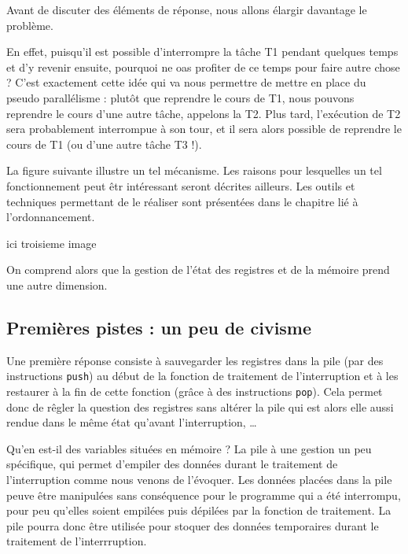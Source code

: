    Avant de discuter des éléments de réponse, nous allons élargir
davantage le problème.

   En effet, puisqu'il est possible d'interrompre la tâche T1
pendant quelques temps et d'y revenir ensuite, pourquoi ne
oas profiter de ce temps pour faire autre chose ? C'est exactement
cette idée qui va nous permettre de mettre en place du pseudo
parallélisme : plutôt que reprendre le cours de T1, nous pouvons
reprendre le cours d'une autre tâche, appelons la T2. Plus tard,
l'exécution de T2 sera probablement interrompue à son tour, et il sera
alors possible de reprendre le cours de T1 (ou d'une autre tâche T3
!). 

   La figure suivante illustre un tel mécanisme. Les raisons pour
lesquelles un tel fonctionnement peut êtr intéressant seront décrites
ailleurs. Les outils et techniques permettant de le réaliser sont
présentées dans le chapitre lié à l'ordonnancement.

ici troisieme image

   On comprend alors que la gestion de l'état des registres et de la
mémoire prend une autre dimension.
   
%
\subsection{Premières pistes : un peu de civisme}

   Une première réponse consiste à sauvegarder les registres dans la
pile (par des instructions \lstinline!push!) au début de la fonction
de traitement de l'interruption et à les restaurer à la fin de cette
fonction (grâce à des instructions \lstinline!pop!). Cela permet donc
de rêgler la question des registres sans altérer la pile qui est alors
elle aussi rendue dans le même état qu'avant l'interruption, \ldots

   Qu'en est-il des variables situées en mémoire ? La pile à une
gestion un peu spécifique, qui permet d'empiler des données durant le
traitement de l'interruption comme nous venons de l'évoquer. Les
données placées dans la pile peuve être manipulées sans conséquence
pour le programme qui a été interrompu, pour peu qu'elles soient
empilées puis dépilées par la fonction de traitement. La pile pourra
donc être utilisée pour stoquer des données temporaires durant le
traitement de l'interrruption.

